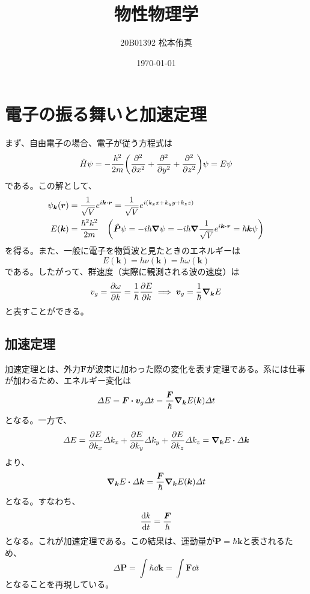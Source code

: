 \documentclass[a4paper,5pt,uplatex]{jsarticle}
\title{物性物理学}
\author{20B01392 松本侑真}
\date{\today}
\theoremstyle{mystyle} %
\begin{document}
\maketitle
\begin{abstract}

\end{abstract}
\tableofcontents
\newpage
\section{電子の振る舞いと加速定理}
まず、自由電子の場合、電子が従う方程式は
\begin{equation}
	\hat{H}\psi = -\frac{\hbar^2}{2m}\qty(\pdv[2]{x} + \pdv[2]{y} + \pdv[2]{z})\psi = E\psi
\end{equation}
である。この解として、
\begin{align}
	\psi_{\bm{k}}(\bm{r}) & = \frac{1}{\sqrt{V}}e^{i\bm{k}\vdot\bm{r}} = \frac{1}{\sqrt{V}}e^{i(k_xx + k_yy + k_zz)}                                                         \\
	E(\bm{k})             & = \frac{\hbar^2k^2}{2m}\quad\qty(\hat{\bm{P}}\psi = -i\hbar\grad{\psi} = -i\hbar\grad\frac{1}{\sqrt{V}}e^{i\bm{k}\vdot\bm{r}} = \hbar\bm{k}\psi)
\end{align}
を得る。また、一般に電子を物質波と見たときのエネルギーは
\begin{equation}
	E(\bm{k}) = h\nu(\bm{k}) = \hbar\omega(\bm{k})
\end{equation}
である。したがって、群速度（実際に観測される波の速度）は
\begin{equation}
	v_{g} = \pdv{\omega}{k} = \frac{1}{\hbar}\pdv{E}{k}\implies \bm{v}_g = \frac{1}{\hbar}\grad_{\bm{k}}E
\end{equation}
と表すことができる。
\subsection{加速定理}
加速定理とは、外力$\bm{F}$が波束に加わった際の変化を表す定理である。系には仕事が加わるため、エネルギー変化は
\begin{equation}
	\varDelta{}E = \bm{F}\vdot\bm{v}_g\varDelta{}t = \frac{\bm{F}}{\hbar}\grad_{\bm{k}}E(\bm{k})\varDelta{}t
\end{equation}
となる。一方で、
\begin{equation}
	\varDelta{}E = \pdv{E}{k_x}\varDelta{}k_x + \pdv{E}{k_y}\varDelta{}k_y + \pdv{E}{k_z}\varDelta{}k_z = \grad_{\bm{k}}{E}\vdot\varDelta\bm{k}
\end{equation}
より、
\begin{equation}
	\grad_{\bm{k}}{E}\vdot\varDelta\bm{k} = \frac{\bm{F}}{\hbar}\grad_{\bm{k}}E(\bm{k})\varDelta{}t
\end{equation}
となる。すなわち、
\begin{equation}
	\dv{k}{t} = \frac{\bm{F}}{\hbar}
\end{equation}
となる。これが加速定理である。この結果は、運動量が$\bm{P} = \hbar\bm{k}$と表されるため、
\begin{equation}
	\varDelta\bm{P} = \int\hbar\dd{\bm{k}} = \int \bm{F}\dd{t}
\end{equation}
となることを再現している。
\end{document}

